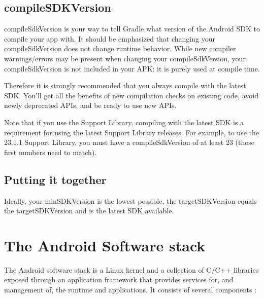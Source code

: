 \subsection{compileSDKVersion}
compileSdkVersion is your way to tell Gradle what version of the Android SDK to compile your app with.
It should be emphasized that changing your compileSdkVersion does not change runtime behavior.
While new compiler warnings/errors may be present when changing your compileSdkVersion, your compileSdkVersion is not included in your APK: it is purely used at compile time.

Therefore it is strongly recommended that you always compile with the latest SDK.
You’ll get all the benefits of new compilation checks on existing code, avoid newly deprecated APIs, and be ready to use new APIs.

Note that if you use the Support Library, compiling with the latest SDK is a requirement for using the latest Support Library releases.
For example, to use the 23.1.1 Support Library, you must have a compileSdkVersion of at least 23 (those first numbers need to match).

\subsection{Putting it together}
Ideally, your minSDKVersion is the lowest possible, the targetSDKVersion equals the targetSDKVersion and is the latest SDK available.

\section{The Android Software stack}
The Android software stack is a Linux kernel and a collection of C/C++ libraries exposed through an application framework that provides services for, and management of, the runtime and applications.
It consists of several components \cite{Google2017}:


